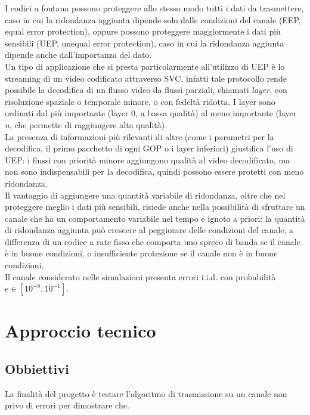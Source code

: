 \documentclass[italian, a4paper, 12pt]{article}
\begin{document}
I codici a fontana possono proteggere allo stesso modo tutti i dati da trasmettere, caso in cui la ridondanza aggiunta dipende solo dalle condizioni del canale (EEP, equal error protection), oppure possono proteggere maggiormente i dati più sensibili (UEP, unequal error protection), caso in cui la ridondanza aggiunta dipende anche dall'importanza del dato.\\
Un tipo di applicazione che si presta particolarmente all'utilizzo di UEP è lo streaming di un video codificato attraverso SVC, infatti tale protocollo rende possibile la decodifica di un flusso video da flussi parziali, chiamati \textit{layer}, con risoluzione spaziale o temporale minore, o con fedeltà ridotta. I layer sono ordinati dal più importante (layer 0, a bassa qualità) al meno importante (layer \textit{n}, che permette di raggiungere alta qualità).\\
La presenza di informazioni più rilevanti di altre (come i parametri per la decodifica, il primo pacchetto di ogni GOP o i layer inferiori) giustifica l'uso di UEP: i flussi con priorità minore aggiungono qualità al video decodificato, ma non sono indispensabili per la decodifica, quindi possono essere protetti con meno ridondanza.\\
Il vantaggio di aggiungere una quantità variabile di ridondanza, oltre che nel proteggere meglio i dati più sensibili, risiede anche nella possibilità di sfruttare un canale che ha un comportamento variabile nel tempo e ignoto a priori: la quantità di ridondanza aggiunta può crescere al peggiorare delle condizioni del canale, a differenza di un codice a rate fisso che comporta uno spreco di banda se il canale è in buone condizioni, o insufficiente protezione se il canale non è in buone condizioni.\\
Il canale considerato nelle simulazioni presenta errori i.i.d. con probabilità $e \in [10^{-8},10^{-1}]$.
\section{Approccio tecnico}
\subsection{Obbiettivi}
La finalità del progetto è testare l'algoritmo di trasmissione su un canale non privo di errori per dimostrare che.
\end{document}
